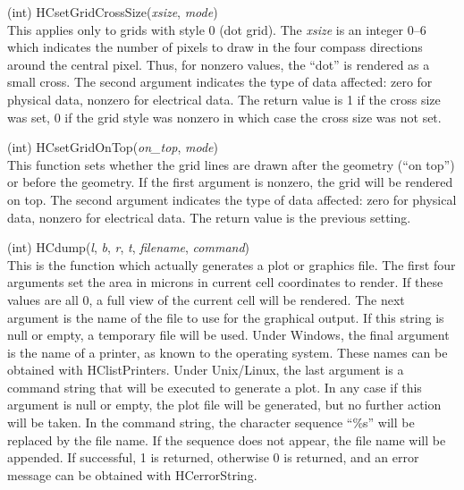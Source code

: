 \begin{description}
\item{(int) \vt HCsetGridCrossSize({\it xsize\/}, {\it mode\/})}\\
This applies only to grids with style 0 (dot grid).  The {\it xsize}
is an integer 0--6 which indicates the number of pixels to draw in the
four compass directions around the central pixel.  Thus, for nonzero
values, the ``dot'' is rendered as a small cross.  The second argument
indicates the type of data affected:  zero for physical data, nonzero
for electrical data.  The return value is 1 if the cross size was set,
0 if the grid style was nonzero in which case the cross size was not
set.

\item{(int) \vt HCsetGridOnTop({\it on\_top\/}, {\it mode\/})}\\
This function sets whether the grid lines are drawn after the geometry
(``on top'') or before the geometry.  If the first argument is
nonzero, the grid will be rendered on top.  The second argument
indicates the type of data affected:  zero for physical data, nonzero
for electrical data.  The return value is the previous setting.

\item{(int) \vt HCdump({\it l}, {\it b}, {\it r}, {\it t}, {\it filename},
  {\it command\/})}\\
This is the function which actually generates a plot or graphics file. 
The first four arguments set the area in microns in current cell
coordinates to render.  If these values are all 0, a full view of the
current cell will be rendered.  The next argument is the name of the
file to use for the graphical output.  If this string is null or
empty, a temporary file will be used.  Under Windows, the final
argument is the name of a printer, as known to the operating system. 
These names can be obtained with {\vt HClistPrinters}.  Under
Unix/Linux, the last argument is a command string that will be
executed to generate a plot.  In any case if this argument is null or
empty, the plot file will be generated, but no further action will be
taken.  In the command string, the character sequence ``{\vt \%s}''
will be replaced by the file name.  If the sequence does not appear,
the file name will be appended.  If successful, 1 is returned,
otherwise 0 is returned, and an error message can be obtained with
{\vt HCerrorString}.


\end{description}
